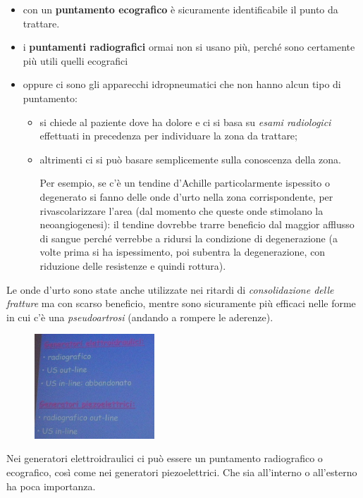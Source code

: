 \begin{itemize}
\item
  con un \textbf{puntamento ecografico} è sicuramente identificabile il
  punto da trattare.
\item
  i \textbf{puntamenti radiografici} ormai non si usano più, perché sono
  certamente più utili quelli ecografici
\item
  oppure ci sono gli apparecchi idropneumatici che non hanno alcun tipo
  di puntamento:

\begin{itemize}
\item
  si chiede al paziente dove ha dolore e ci si basa su \emph{esami
  radiologici} effettuati in precedenza per individuare la zona da
  trattare;
\item
  altrimenti ci si può basare semplicemente sulla conoscenza della zona.

Per esempio, se c'è un tendine d'Achille particolarmente ispessito o
degenerato si fanno delle onde d'urto nella zona corrispondente, per
rivascolarizzare l'area (dal momento che queste onde stimolano la
neoangiogenesi): il tendine dovrebbe trarre beneficio dal maggior
afflusso di sangue perché verrebbe a ridursi la condizione di
degenerazione (a volte prima si ha ispessimento, poi subentra la
degenerazione, con riduzione delle resistenze e quindi rottura).
\end{itemize}
\end{itemize}
Le onde d'urto sono state anche utilizzate nei ritardi di
\emph{consolidazione delle fratture} ma con scarso beneficio, mentre
sono sicuramente più efficaci nelle forme in cui c'è una
\emph{pseudoartrosi} (andando a rompere le aderenze).

\begin{figure}[!ht]
\centering
\includegraphics[width=0.4\textwidth]{025/image7.jpeg}
\end{figure}

Nei generatori elettroidraulici ci può essere un puntamento radiografico
o ecografico, così come nei generatori piezoelettrici. Che sia
all'interno o all'esterno ha poca importanza.

